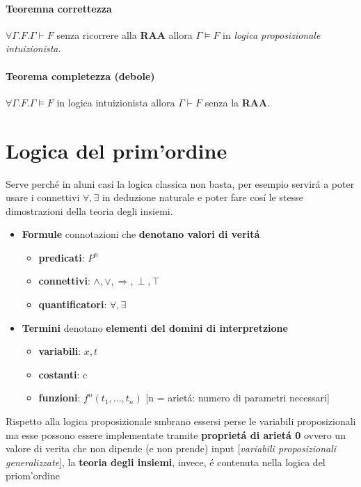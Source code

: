 \documentclass{article}
\begin{document}
\paragraph{Teoremna correttezza} $\forall\Gamma.F. \Gamma \vdash F$ senza ricorrere alla \textbf{RAA} allora $\Gamma \vDash F$ in \textit{logica proposizionale intuizionista}.
\paragraph{Teorema completezza (debole)} $\forall\Gamma. F. \Gamma\vDash F$ in logica intuizionista allora $\Gamma \vdash F$ senza la \textbf{RAA}.

\section{Logica del prim'ordine}
Serve perché in aluni casi la logica classica non basta, per esempio servirá a poter usare i connettivi $\forall,\exists$ in deduzione naturale e poter fare cosí le stesse dimostrazioni della teoria degli insiemi.
\begin{itemize}
    \item \textbf{Formule} connotazioni che \textbf{denotano valori di veritá} \begin{itemize}
        \item \textbf{predicati}: $P^n$
        \item \textbf{connettivi}: $\land, \lor,\Rightarrow,\perp,\top$
        \item \textbf{quantificatori}: $\forall,\exists$
    \end{itemize}
    \item \textbf{Termini} denotano \textbf{elementi del domini di interpretzione} \begin{itemize}
        \item \textbf{variabili}: $x,t$
        \item \textbf{costanti}: c
        \item \textbf{funzioni}: $f^n(t_1,...,t_n)$ [n = arietá: numero di parametri necessari]
    \end{itemize}
\end{itemize}

Rispetto alla logica proposizionale smbrano essersi perse le variabili proposizionali ma esse possono essere implementate tramite \textbf{proprietá di arietá 0} ovvero un valore di verita che non dipende (e non prende) input [\textit{variabili proposizionali generalizzate}], la \textbf{teoria degli insiemi}, invece, é contenuta nella logica del priom'ordine
\end{document}
